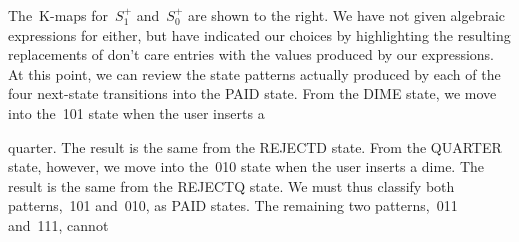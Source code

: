\begin{minipage}{3.9in}
The~\mbox{K-maps} for~$S_1^+$ and~$S_0^+$ are shown to the right.
We have not given algebraic expressions for either, but have indicated
our choices by highlighting the resulting replacements of don't care
entries with the values produced by our expressions.
%
At this point, we can review the state patterns actually produced by
each of the four next-state transitions into the PAID state.  From
the DIME state, we move into the~101 state when the user inserts a\linebreak
\end{minipage}\hspace{0.25in}%
\begin{minipage}{1.05in}
\vspace{12pt}
\end{minipage}\hspace{0.25in}%
\begin{minipage}{1.05in}
\vspace{12pt}
\end{minipage}\mpdone

quarter.  The result is the same from the REJECTD state.  From the
QUARTER state, however, we move into the~010 state when the user 
inserts a dime.  The result is the same from the REJECTQ state.  We
must thus classify both patterns,~101 and~010, as PAID states.  The
remaining two patterns,~011 and~111, cannot\linebreak

